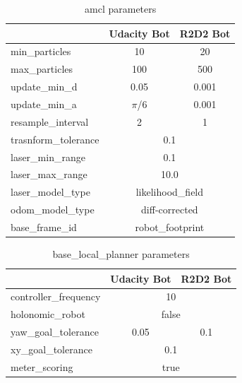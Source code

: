 \documentclass[10pt,journal,compsoc]{IEEEtran}
\begin{document}
\begin{table}[H]
\centering
\begin{tabular}{|l|c|c|}
\hline
\rowcolor[HTML]{C0C0C0} 
\multicolumn{1}{|c|}{\cellcolor[HTML]{C0C0C0}\textbf{amcl parameter}} & \textbf{Udacity Bot} & \textbf{R2D2 Bot} \\ \hline
min\_particles         & 10                   & 20                \\ \hline
max\_particles         & 100                  & 500               \\ \hline
update\_min\_d         & 0.05                 & 0.001             \\ \hline
update\_min\_a         & \( \pi \)/6          & 0.001             \\ \hline
resample\_interval     & 2                    & 1                 \\ \hline
trasnform\_tolerance   & \multicolumn{2}{c|}{0.1}                 \\ \hline
laser\_min\_range      & \multicolumn{2}{c|}{0.1}                 \\ \hline
laser\_max\_range      & \multicolumn{2}{c|}{10.0}                \\ \hline
laser\_model\_type     & \multicolumn{2}{c|}{likelihood\_field}   \\ \hline
odom\_model\_type      & \multicolumn{2}{c|}{diff-corrected}      \\ \hline
base\_frame\_id        & \multicolumn{2}{c|}{robot\_footprint}    \\ \hline
\end{tabular}
\caption{amcl parameters}
\label{tab:amcl-param}
\end{table}

\begin{table}[H]
\centering
\begin{tabular}{|l|c|c|}
\hline
\rowcolor[HTML]{C0C0C0} 
\multicolumn{1}{|c|}{\cellcolor[HTML]{C0C0C0}\textbf{base\_local\_planner parameters}} & \textbf{Udacity Bot} & \textbf{R2D2 Bot} \\ \hline
controller\_frequency   & \multicolumn{2}{c|}{10}                  \\ \hline
holonomic\_robot        & \multicolumn{2}{c|}{false}               \\ \hline
yaw\_goal\_tolerance    & 0.05                 & 0.1               \\ \hline
xy\_goal\_tolerance     & \multicolumn{2}{c|}{0.1}                 \\ \hline
meter\_scoring          & \multicolumn{2}{c|}{true}                \\ \hline
\end{tabular}
\caption{base\_local\_planner parameters}
\label{tab:blc-param}
\end{table}
\end{document}
